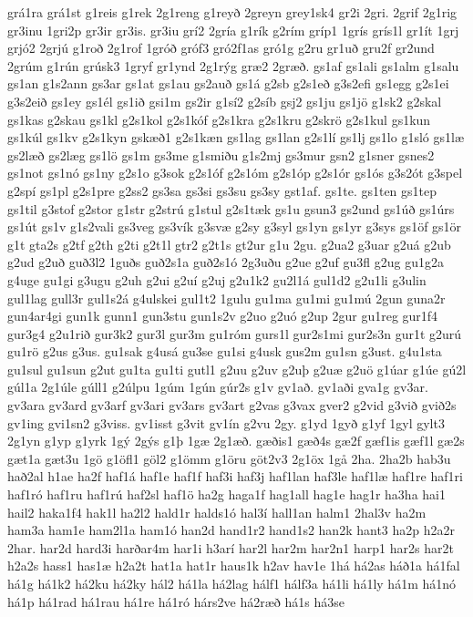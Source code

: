 {grá1ra
grá1st
g1reis
g1rek
2g1reng
g1reyð
2greyn
grey1sk4
gr2i
2gri.
2grif
2g1rig
gr3inu
1gri2p
gr3ir
gr3is.
gr3iu
grí2
2gría
g1rík
g2rím
gríp1
1grís
grís1l
gr1ít
1grj
grjó2
2grjú
g1roð
2g1rof
1gróð
gróf3
gró2f1as
gró1g
g2ru
gr1uð
gru2f
gr2und
2grúm
g1rún
grúsk3
1gryf
gr1ynd
2g1rýg
græ2
2græð.
gs1af
gs1ali
gs1alm
g1salu
gs1an
g1s2ann
gs3ar
gs1at
gs1au
gs2auð
gs1á
g2sb
g2s1eð
g3s2efi
gs1egg
g2s1ei
g3s2eið
gs1ey
gs1él
gs1ið
gsi1m
gs2ir
g1sí2
g2síb
gsj2
gs1ju
gs1jö
g1sk2
g2skal
gs1kas
g2skau
gs1kl
g2s1kol
g2s1kóf
g2s1kra
g2s1kru
g2skrö
g2s1kul
gs1kun
gs1kúl
gs1kv
g2s1kyn
gskæð1
g2s1kæn
gs1lag
gs1lan
g2s1lí
gs1lj
gs1lo
g1sló
gs1læ
gs2læð
gs2læg
gs1lö
gs1m
gs3me
g1smiðu
g1s2mj
gs3mur
gsn2
g1sner
gsnes2
gs1not
gs1nó
gs1ny
g2s1o
g3sok
g2s1óf
g2s1óm
g2s1óp
g2s1ór
gs1ós
g3s2ót
g3spel
g2spí
gs1pl
g2s1pre
g2ss2
gs3sa
gs3si
gs3su
gs3sy
gst1af.
gs1te.
gs1ten
gs1tep
gs1til
g3stof
g2stor
g1str
g2strú
g1stul
g2s1tæk
gs1u
gsun3
gs2und
gs1úð
gs1úrs
gs1út
gs1v
g1s2vali
gs3veg
gs3vík
g3svæ
g2sy
g3syl
gs1yn
gs1yr
g3sys
gs1öf
gs1ör
g1t
gta2s
g2tf
g2th
g2ti
g2t1l
gtr2
g2t1s
gt2ur
g1u
2gu.
g2ua2
g3uar
g2uá
g2ub
g2ud
g2uð
guð3l2
1guðs
guð2s1a
guð2s1ó
2g3uðu
g2ue
g2uf
gu3fl
g2ug
gu1g2a
g4uge
gu1gi
g3ugu
g2uh
g2ui
g2uí
g2uj
g2u1k2
gu2l1á
gul1d2
g2u1li
g3ulin
gul1lag
gull3r
gul1s2á
g4ulskei
gul1t2
1gulu
gu1ma
gu1mi
gu1mú
2gun
guna2r
gun4ar4gi
gun1k
gunn1
gun3stu
gun1s2v
g2uo
g2uó
g2up
2gur
gu1reg
gur1f4
gur3g4
g2u1rið
gur3k2
gur3l
gur3m
gu1róm
gurs1l
gur2s1mi
gur2s3n
gur1t
g2urú
gu1rö
g2us
g3us.
gu1sak
g4usá
gu3se
gu1si
g4usk
gus2m
gu1sn
g3ust.
g4u1sta
gu1sul
gu1sun
g2ut
gu1ta
gu1ti
gutl1
g2uu
g2uv
g2uþ
g2uæ
g2uö
g1úar
g1úe
gú2l
gúl1a
2g1úle
gúll1
g2úlpu
1gúm
1gún
gúr2s
g1v
gv1að.
gv1aði
gva1g
gv3ar.
gv3ara
gv3ard
gv3arf
gv3ari
gv3ars
gv3art
g2vas
g3vax
gver2
g2vid
g3við
gvið2s
gv1ing
gvi1sn2
g3viss.
gv1isst
g3vit
gv1ín
g2vu
2gy.
g1yd
1gyð
g1yf
1gyl
gylt3
2g1yn
g1yp
g1yrk
1gý
2gýs
g1þ
1gæ
2g1æð.
gæðis1
gæð4s
gæ2f
gæf1is
gæf1l
gæ2s
gæt1a
gæt3u
1gö
g1öfl1
göl2
g1ömm
g1öru
göt2v3
2g1öx
1gå
2ha.
2ha2b
hab3u
hað2al
h1ae
ha2f
haf1á
haf1e
haf1f
haf3i
haf3j
haf1lan
haf3le
haf1læ
haf1re
haf1ri
haf1ró
haf1ru
haf1rú
haf2sl
haf1ö
ha2g
haga1f
hag1all
hag1e
hag1r
ha3ha
hai1
hail2
haka1f4
hak1l
ha2l2
hald1r
halds1ó
hal3í
hall1an
halm1
2hal3v
ha2m
ham3a
ham1e
ham2l1a
ham1ó
han2d
hand1r2
hand1s2
han2k
hant3
ha2p
h2a2r
2har.
har2d
hard3i
harðar4m
har1i
h3arí
har2l
har2m
har2n1
harp1
har2s
har2t
h2a2s
hass1
has1æ
h2a2t
hat1a
hat1r
haus1k
h2av
hav1e
1há
há2as
háð1a
há1fal
há1g
há1k2
há2ku
há2ky
hál2
há1la
há2lag
hálf1
hálf3a
há1li
há1ly
há1m
há1nó
há1p
há1rad
há1rau
há1re
há1ró
hárs2ve
há2ræð
há1s
há3se
}

